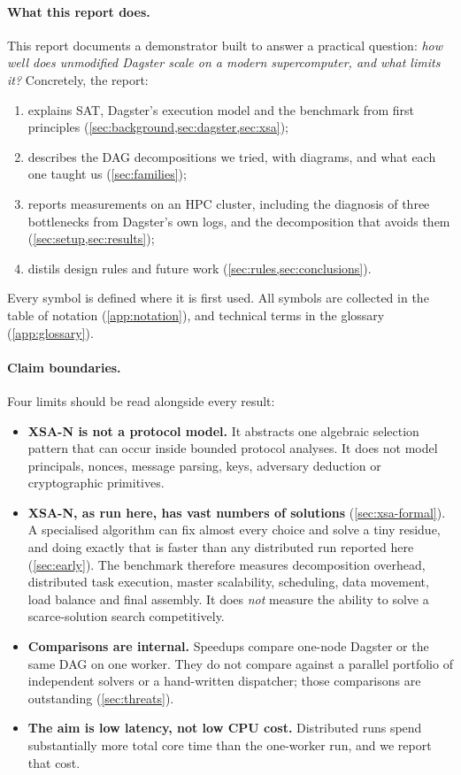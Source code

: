 \documentclass[11pt,a4paper]{article}
\newcommand{\XSA}{\textsf{XSA-N}}
\begin{document}
\paragraph{What this report does.}
This report documents a demonstrator built to answer a practical question: \emph{how well
does unmodified Dagster scale on a modern supercomputer, and what limits it?} Concretely,
the report:
\begin{enumerate}
\item explains SAT, Dagster's execution model and the benchmark from first principles
      (\cref{sec:background,sec:dagster,sec:xsa});
\item describes the DAG decompositions we tried, with diagrams, and what each one taught us
      (\cref{sec:families});
\item reports measurements on an HPC cluster, including the diagnosis of three
      bottlenecks from Dagster's own logs, and the decomposition that avoids them
      (\cref{sec:setup,sec:results});
\item distils design rules and future work (\cref{sec:rules,sec:conclusions}).
\end{enumerate}
Every symbol is defined where it is first used. All symbols are collected in the table of
notation (\cref{app:notation}), and technical terms in the glossary (\cref{app:glossary}).

\paragraph{Claim boundaries.}
\label{sec:boundaries}
Four limits should be read alongside every result:
\begin{itemize}
\item \textbf{\XSA{} is not a protocol model.} It abstracts one algebraic selection pattern
      that can occur inside bounded protocol analyses. It does not model principals, nonces,
      message parsing, keys, adversary deduction or cryptographic primitives.
\item \textbf{\XSA{}, as run here, has vast numbers of solutions} (\cref{sec:xsa-formal}). A
      specialised algorithm can fix almost every choice and solve a tiny residue, and doing
      exactly that is faster than any distributed run reported here (\cref{sec:early}). The
      benchmark therefore measures decomposition overhead, distributed task execution, master
      scalability, scheduling, data movement, load balance and final assembly. It does
      \emph{not} measure the ability to solve a scarce-solution search competitively.
\item \textbf{Comparisons are internal.} Speedups compare one-node Dagster or the same DAG on
      one worker. They do not compare against a parallel portfolio of independent solvers or
      a hand-written dispatcher; those comparisons are outstanding (\cref{sec:threats}).
\item \textbf{The aim is low latency, not low CPU cost.} Distributed runs spend
      substantially more total core time than the one-worker run, and we report that cost.
\end{itemize}
\end{document}
